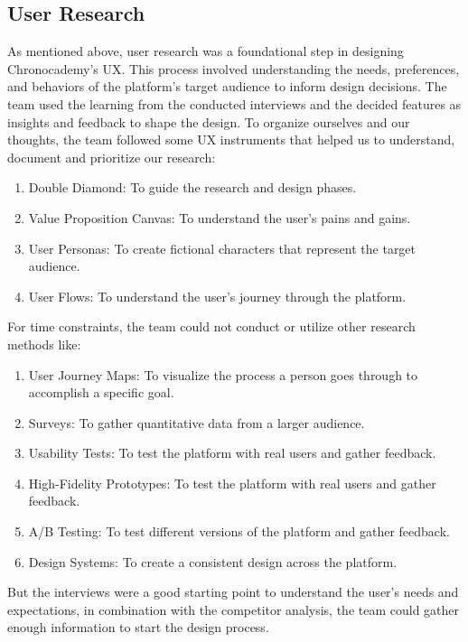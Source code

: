 \subsection{User Research}\label{subsec:user-research}
As mentioned above, user research was a foundational step in designing Chronocademy's UX\@.
This process involved understanding the needs, preferences, and behaviors of the platform's target audience to inform design decisions.
The team used the learning from the conducted interviews and the decided features as insights and feedback to shape the design.
To organize ourselves and our thoughts, the team followed some UX instruments that helped us to understand, document and prioritize our research:\newline
\begin{enumerate}
    \item Double Diamond: To guide the research and design phases.
    \item Value Proposition Canvas: To understand the user's pains and gains.
    \item User Personas: To create fictional characters that represent the target audience.
    \item User Flows: To understand the user's journey through the platform.
\end{enumerate}

For time constraints, the team could not conduct or utilize other research methods like:\newline
\begin{enumerate}
    \item User Journey Maps: To visualize the process a person goes through to accomplish a specific goal.
    \item Surveys: To gather quantitative data from a larger audience.
    \item Usability Tests: To test the platform with real users and gather feedback.
    \item High-Fidelity Prototypes: To test the platform with real users and gather feedback.
    \item A/B Testing: To test different versions of the platform and gather feedback.
    \item Design Systems: To create a consistent design across the platform.
\end{enumerate}

But the interviews were a good starting point to understand the user's needs and expectations, in combination with the competitor analysis, the team could gather enough information to start the design process.

